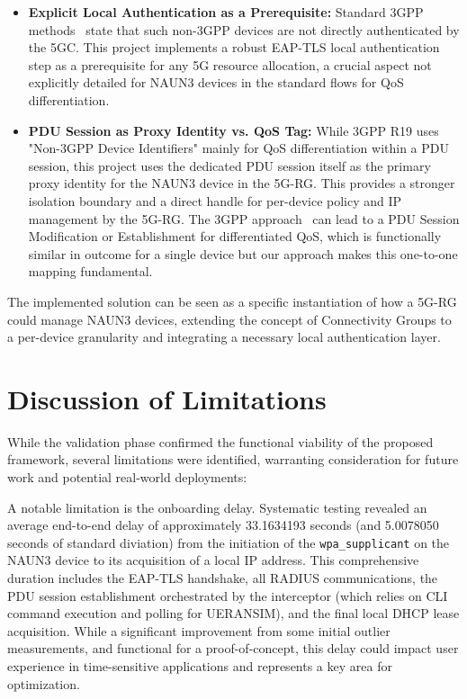 \begin{itemize}
    \item \textbf{Explicit Local Authentication as a Prerequisite:} Standard \ac{3GPP} methods~\cite{23.501-p564} state that such non-\ac{3GPP} devices are not directly authenticated by the \ac{5GC}. This project implements a robust \ac{EAP-TLS} local authentication step as a prerequisite for any \ac{5G} resource allocation, a crucial aspect not explicitly detailed for \ac{NAUN3} devices in the standard flows for \ac{QoS} differentiation.

    \item \textbf{\ac{PDU} Session as Proxy Identity vs. \ac{QoS} Tag:} While \ac{3GPP} R19 uses "Non-\ac{3GPP} Device Identifiers" mainly for \ac{QoS} differentiation within a \ac{PDU} session, this project uses the dedicated \ac{PDU} session itself as the primary proxy identity for the \ac{NAUN3} device in the \ac{5G-RG}. This provides a stronger isolation boundary and a direct handle for per-device policy and \ac{IP} management by the \ac{5G-RG}. The \ac{3GPP} approach~\cite{23.316-p95} can lead to a \ac{PDU} Session Modification or Establishment for differentiated \ac{QoS}, which is functionally similar in outcome for a single device but our approach makes this one-to-one mapping fundamental.
\end{itemize}

The implemented solution can be seen as a specific instantiation of how a \ac{5G-RG} could manage \ac{NAUN3} devices, extending the concept of Connectivity Groups to a per-device granularity and integrating a necessary local authentication layer.

\section{Discussion of Limitations}

While the validation phase confirmed the functional viability of the proposed framework, several limitations were identified, warranting consideration for future work and potential real-world deployments:

A notable limitation is the onboarding delay. Systematic testing revealed an average end-to-end delay of approximately 33.1634193 seconds (and 5.0078050 seconds of standard diviation) from the initiation of the \texttt{wpa\_supplicant} on the \ac{NAUN3} device to its acquisition of a local \ac{IP} address. This comprehensive duration includes the \ac{EAP-TLS} handshake, all \ac{RADIUS} communications, the \ac{PDU} session establishment orchestrated by the interceptor (which relies on \ac{CLI} command execution and polling for UERANSIM), and the final local \ac{DHCP} lease acquisition. While a significant improvement from some initial outlier measurements, and functional for a proof-of-concept, this delay could impact user experience in time-sensitive applications and represents a key area for optimization.

